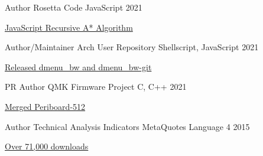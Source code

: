 

\begin{cventries}


  \cventry
    {Author} %
    {Rosetta Code} %
    {JavaScript} %
    {2021} %
    {
      \begin{cvitems} %
        \item {
            \href{https://rosettacode.org/wiki/A*_search_algorithm#JavaScript}
            {JavaScript Recursive A* Algorithm \faExternalLink}
        }
      \end{cvitems}
    }

  \cventry
    {Author/Maintainer} %
    {Arch User Repository} %
    {Shellscript, JavaScript} %
    {2021} %
    {
      \begin{cvitems} %
        \item {
            \href{https://aur.archlinux.org/packages/dmenu_bw/}
            {Released dmenu\_bw and dmenu\_bw-git \faExternalLink}
        }
      \end{cvitems}
    }

  \cventry
    {PR Author} %
    {QMK Firmware Project} %
    {C, C++} %
    {2021} %
    {
      \begin{cvitems} %
        \item {
            \href{https://github.com/qmk/qmk_firmware/pull/12324}
            {Merged Periboard-512 \faExternalLink}
        }
      \end{cvitems}
    }

  \cventry
    {Author} %
    {Technical Analysis Indicators} %
    {MetaQuotes Language 4} %
    {2015} %
    {
      \begin{cvitems} %
        \item {
            \href{https://www.forexfactory.com/thread/538297-the-best-pivot-points-indicator-ever}
            {Over 71,000 downloads \faExternalLink}
        }
      \end{cvitems}
    }

\end{cventries}
